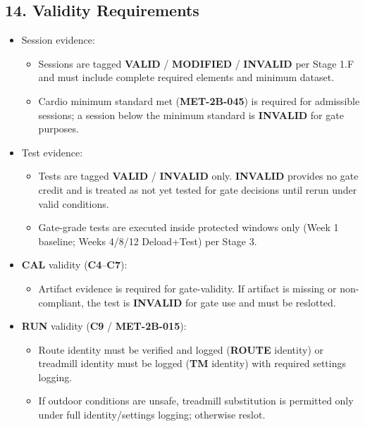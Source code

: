 \documentclass[10pt]{article}
\begin{document}
\begin{landscape}
\begin{longtblr}
\end{longtblr}

\endgroup

\subsection*{14. Validity Requirements}

\begin{itemize}
\item Session evidence:
\begin{itemize}
\item Sessions are tagged \textbf{VALID} / \textbf{MODIFIED} / \textbf{INVALID} per Stage 1.F and must include complete required elements and minimum dataset.
\item Cardio minimum standard met (\textbf{MET-2B-045}) is required for admissible sessions; a session below the minimum standard is \textbf{INVALID} for gate purposes.
\end{itemize}
\item Test evidence:
\begin{itemize}
\item Tests are tagged \textbf{VALID} / \textbf{INVALID} only. \textbf{INVALID} provides no gate credit and is treated as not yet tested for gate decisions until rerun under valid conditions.
\item Gate-grade tests are executed inside protected windows only (Week 1 baseline; Weeks 4/8/12 Deload+Test) per Stage 3.
\end{itemize}
\item \textbf{CAL} validity (\textbf{C4}–\textbf{C7}):
\begin{itemize}
\item Artifact evidence is required for gate-validity. If artifact is missing or non-compliant, the test is \textbf{INVALID} for gate use and must be reslotted.
\end{itemize}
\item \textbf{RUN} validity (\textbf{C9} / \textbf{MET-2B-015}):
\begin{itemize}
\item Route identity must be verified and logged (\textbf{ROUTE} identity) or treadmill identity must be logged (\textbf{TM} identity) with required settings logging.
\item If outdoor conditions are unsafe, treadmill substitution is permitted only under full identity/settings logging; otherwise reslot.
\end{itemize}

\end{itemize}
\end{landscape}
\end{document}
